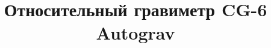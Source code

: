 \documentclass[10pt,twoside]{manual}
\title{Относительный гравиметр CG-6 Autograv\texttrademark{}}
\begin{document}
\newcommand{\cg}{CG-6 Autograv\texttrademark{}}

\maketitle
\tableofcontents








%
%
\end{document}
